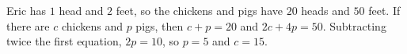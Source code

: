 Eric has $1$ head and $2$ feet, so the chickens and pigs have $20$ heads and $50$ feet. If there are $c$ chickens and $p$ pigs, then $c+p=20$ and $2c+4p=50$. Subtracting twice the first equation, $2p=10$, so $p=5$ and $c=\boxed{15}$.
